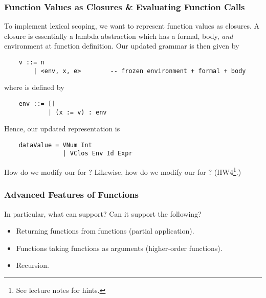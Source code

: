 \documentclass[letterpaper]{article}
\begin{document}
\subsubsection{Function Values as Closures \& Evaluating Function Calls}
To implement lexical scoping, we want to represent function values as closures. A closure is essentially a lambda abstraction which has a formal, body, \emph{and} environment at function definition. Our updated grammar is then given by 
\begin{verbatim}
    v ::= n 
        | <env, x, e>        -- frozen environment + formal + body\end{verbatim}
where  is defined by 
\begin{verbatim}
    env ::= [] 
            | (x := v) : env\end{verbatim}
Hence, our updated  representation is 
\begin{verbatim}
    dataValue = VNum Int 
                | VClos Env Id Expr \end{verbatim}
How do we modify our  for ? Likewise, how do we modify our  for ? (HW4\footnote{See lecture notes for hints.}.)

\subsubsection{Advanced Features of Functions}
In particular, what can  support? Can it support the following? 
\begin{itemize}
    \item Returning functions from functions (partial application). 
    \item Functions taking functions as arguments (higher-order functions). 
    \item Recursion.
\end{itemize}
\end{document}
